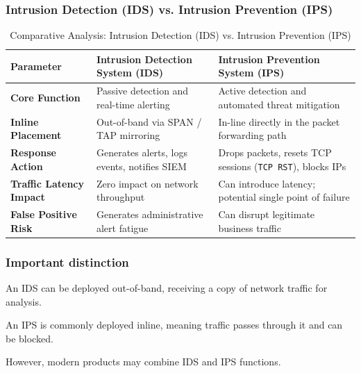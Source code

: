 \subsubsection{Intrusion Detection (IDS) vs. Intrusion Prevention (IPS)}
\begin{table}[htbp]
\centering
\caption{Comparative Analysis: Intrusion Detection (IDS) vs. Intrusion Prevention (IPS)}
\label{tab:ids_vs_ips}
\begin{tabularx}{\textwidth}{p{3.2cm} X X}
\toprule
\textbf{Parameter} & \textbf{Intrusion Detection System (IDS)} & \textbf{Intrusion Prevention System (IPS)} \\
\midrule
\textbf{Core Function} & Passive detection and real-time alerting & Active detection and automated threat mitigation \\
\textbf{Inline Placement} & Out-of-band via SPAN / TAP mirroring & In-line directly in the packet forwarding path \\
\textbf{Response Action} & Generates alerts, logs events, notifies SIEM & Drops packets, resets TCP sessions (\texttt{TCP RST}), blocks IPs \\
\textbf{Traffic Latency Impact} & Zero impact on network throughput & Can introduce latency; potential single point of failure \\
\textbf{False Positive Risk} & Generates administrative alert fatigue & Can disrupt legitimate business traffic \\
\bottomrule
\end{tabularx}
\end{table}


\subsubsection{Important distinction}

An IDS can be deployed out-of-band, receiving a copy of network traffic for analysis.

An IPS is commonly deployed inline, meaning traffic passes through it and can be blocked.

However, modern products may combine IDS and IPS functions.

